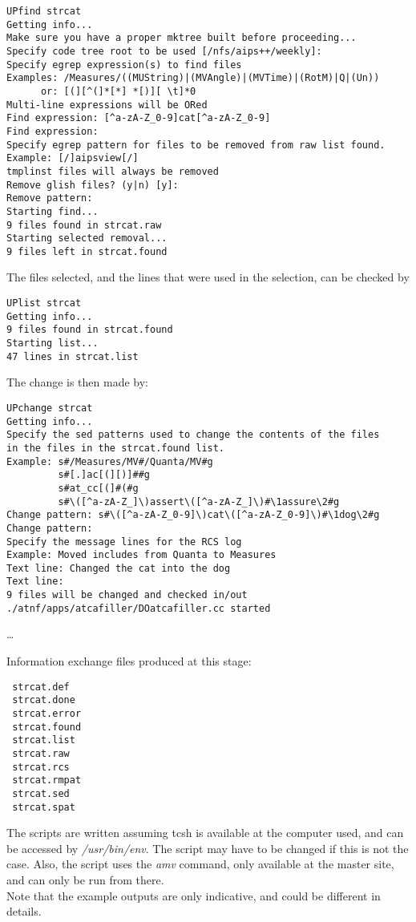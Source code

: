 \begin{verbatim}
UPfind strcat 
Getting info...
Make sure you have a proper mktree built before proceeding...
Specify code tree root to be used [/nfs/aips++/weekly]: 
Specify egrep expression(s) to find files
Examples: /Measures/((MUString)|(MVAngle)|(MVTime)|(RotM)|Q|(Un))
      or: [(][^(]*[*] *[)][ \t]*0
Multi-line expressions will be ORed
Find expression: [^a-zA-Z_0-9]cat[^a-zA-Z_0-9]
Find expression: 
Specify egrep pattern for files to be removed from raw list found.
Example: [/]aipsview[/]
tmplinst files will always be removed
Remove glish files? (y|n) [y]: 
Remove pattern: 
Starting find...
9 files found in strcat.raw
Starting selected removal...
9 files left in strcat.found
\end{verbatim}

\noindent
The files selected, and the lines that were used in the selection, can be
checked by

\begin{verbatim}
UPlist strcat
Getting info...
9 files found in strcat.found
Starting list...
47 lines in strcat.list
\end{verbatim}

\noindent
The change is then made by:

\begin{verbatim}
UPchange strcat
Getting info...
Specify the sed patterns used to change the contents of the files 
in the files in the strcat.found list. 
Example: s#/Measures/MV#/Quanta/MV#g
         s#[.]ac[(][)]##g
         s#at_cc[(]#(#g
         s#\([^a-zA-Z_]\)assert\([^a-zA-Z_]\)#\1assure\2#g
Change pattern: s#\([^a-zA-Z_0-9]\)cat\([^a-zA-Z_0-9]\)#\1dog\2#g
Change pattern: 
Specify the message lines for the RCS log
Example: Moved includes from Quanta to Measures
Text line: Changed the cat into the dog   
Text line: 
9 files will be changed and checked in/out
./atnf/apps/atcafiller/DOatcafiller.cc started
\end{verbatim}
\ldots

\noindent
Information exchange files produced at this stage:

\begin{verbatim}
 strcat.def
 strcat.done
 strcat.error
 strcat.found
 strcat.list
 strcat.raw
 strcat.rcs
 strcat.rmpat
 strcat.sed
 strcat.spat
\end{verbatim}

\noindent
The scripts are written assuming tcsh is available at the computer used, and
can be accessed by {\em /usr/bin/env}. The script may have to be changed
if this is not the case. Also, the  script uses the {\em amv}
command, only available at the master site, and can only be run from there.\\
Note that the example outputs are only indicative, and could be different in
details. 

